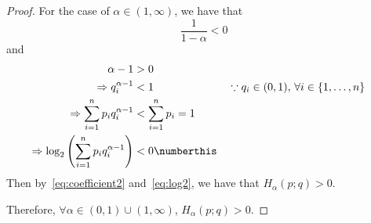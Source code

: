\documentclass[
  coursecode={MTHE 474},
  assignmentname={Homework \homeworknumber},
  studentnumber=20053722,
  name={Bryan Hoang}
]{
  ltxanswer%
}
\begin{document}
\begin{questions}
\begin{parts}
\begin{solution}
\begin{proof}
          For the case of \(\alpha \in (1, \infty)\), we have that
          \begin{equation}\label{eq:coefficient2}
            \frac{1}{1-\alpha} < 0
          \end{equation}
          and
          \begin{align*}
            \alpha - 1                                                                                                                                                               &> 0                                                                                         \\
            \Rightarrow q_{i}^{\alpha-1}                                                                                                                                             &< 1                           & &\because q_{i} \in (0,1),\, \forall i \in \{1, \dotsc, n\} \\
            \Rightarrow                                                                                                                         \sum_{i=1}^{n} p_{i}q_{i}^{\alpha-1} &< \sum_{i=1}^{n} p_{i} = 1                                                                  \\
            \Rightarrow \log_{2}\left(\sum_{i=1}^{n} p_{i}q_{i}^{\alpha-1}\right)                                                                                                    &< 0\numberthis\label{eq:log2}
          \end{align*}
          Then by~\eqref{eq:coefficient2} and~\eqref{eq:log2}, we have that \(H_{\alpha}(p;q) > 0\).

          Therefore, \(\forall \alpha \in (0,1) \cup (1,\infty)\), \(H_{\alpha}(p;q) > 0\).
        \end{proof}
      \end{solution}


\end{parts}
\end{questions}
\end{document}
